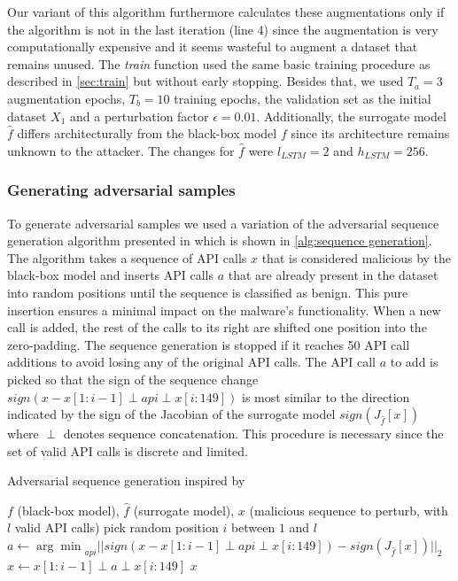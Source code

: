 \documentclass[final]{cvpr}
\begin{document}
Our variant of this algorithm furthermore calculates these augmentations 
only if the algorithm is not in the last iteration (line 4) since the 
augmentation is very computationally expensive and it seems wasteful to augment 
a dataset that remains unused. The \textit{train} function used the same basic 
training procedure as described in \autoref{sec:train} but without early 
stopping. Besides that, we used $T_a = 3$ augmentation 
epochs, $T_b = 10$ training epochs, the validation set as the initial dataset 
$X_1$ and a perturbation factor $\epsilon = 0.01$. Additionally, the surrogate 
model $\hat{f}$ differs architecturally from the black-box model $f$ since its 
architecture remains unknown to the attacker. The changes for $\hat{f}$ were 
$l_{LSTM} = 2$ and $h_{LSTM} = 256$.


\subsubsection{Generating adversarial samples}
To generate adversarial samples we used a variation of the adversarial 
sequence generation algorithm presented in 
\autocite[7]{DBLP:journals/corr/RosenbergSRE17} which is shown in 
\autoref{alg:sequence generation}. The algorithm takes a sequence of API calls 
$x$ that is considered malicious by the black-box model and inserts API calls 
$a$ that are already present in the dataset into random positions until the 
sequence is classified as benign. This pure insertion ensures a minimal impact 
on the malware's functionality. When a new call is added, the rest of the calls 
to its right are shifted one position into the zero-padding. The 
sequence generation is stopped if it reaches 50 API call additions to avoid 
losing any of the original API calls. The API call $a$ to 
add is picked so that the sign of the sequence change $sign(x - x[1: i-1] \perp 
api \perp x[i: 149])$ is most similar to the direction indicated by the sign of 
the Jacobian of the surrogate model $sign(J_{\hat{f}}[x])$ where $\perp$ 
denotes sequence concatenation. This procedure is necessary since the set of 
valid API calls is discrete and limited. 
\autocite[6-8]{DBLP:journals/corr/RosenbergSRE17}


\begin{algorithm}
	\caption{Adversarial sequence generation inspired by
	\autocite[7]{DBLP:journals/corr/RosenbergSRE17}}
	\label{alg:sequence generation}
	\begin{algorithmic}[1]
		\Require $f$ (black-box model),  $\hat{f}$ (surrogate model), $x$ 
		(malicious sequence to perturb, with $l$ valid API calls)
		    \State pick random position $i$ between $1$ and $l$
			\State $a \gets {\arg\min}_{api} ||sign(x - x[1: i-1] \perp 
			api \perp x[i: 149]) - sign(J_{\hat{f}}[x])||_2$
			\State $x \gets x[1: i-1] \perp a \perp x[i: 149]$
		\EndWhile
		\Return $x$
	\end{algorithmic}
\end{algorithm}
\end{document}
